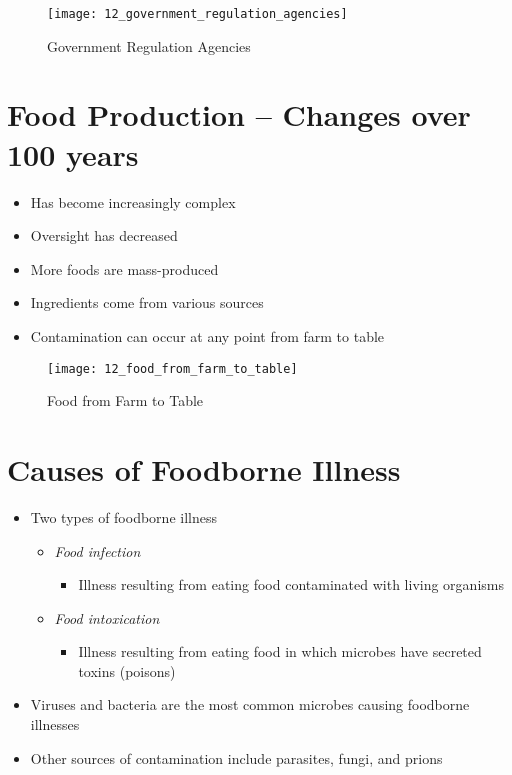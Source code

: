 \documentclass[title={Chapter 12}]{fdsn201notes}
\begin{document}
\begin{figure}[H]
	\centering
	\texttt{[image: 12\_government\_regulation\_agencies]}
	\caption{Government Regulation Agencies}
	\label{fig:government-regulation-agencies}
\end{figure}

\section{Food Production – Changes over 100 years}\label{sec:food-production--changes-over-100-years}
\begin{itemize}
	\item Has become increasingly complex
	\item Oversight has decreased
	\item More foods are mass-produced
	\item Ingredients come from various sources
	\item Contamination can occur at any point from farm to table
\end{itemize}

\begin{figure}[H]
	\centering
	\texttt{[image: 12\_food\_from\_farm\_to\_table]}
	\caption{Food from Farm to Table}
	\label{fig:food-from-farm-to-table}
\end{figure}

\section{Causes of Foodborne Illness}\label{sec:causes-of-foodborne-illness}
\begin{itemize}
	\item Two types of foodborne illness
	\begin{itemize}
		\item \emph{Food infection}
		\begin{itemize}
			\item Illness resulting from eating food contaminated with living organisms
		\end{itemize}
	\end{itemize}
	\begin{itemize}
		\item \emph{Food intoxication}
		\begin{itemize}
			\item Illness resulting from eating food in which microbes have secreted toxins (poisons)
		\end{itemize}
	\end{itemize}
	\item Viruses and bacteria are the most common microbes causing foodborne illnesses
	\item Other sources of contamination include parasites, fungi, and prions
\end{itemize}
\end{document}
